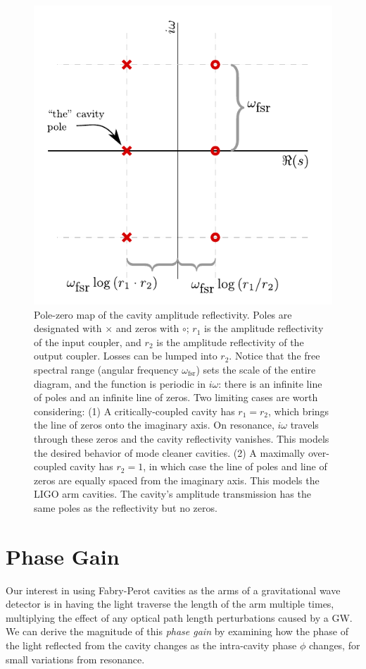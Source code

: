 \begin{figure}
\centering\includegraphics{figures/cavitypzmap.pdf}
\caption[Pole-zero map of Fabry-Perot cavity reflectivity]{\label{fig:cavpzmap} Pole-zero map of the cavity amplitude
  reflectivity.
  Poles are designated with $\times$ and zeros with
  $\circ$; $r_1$ is the amplitude reflectivity of the input coupler,
  and $r_2$ is the amplitude reflectivity of the output coupler.
  Losses can be lumped into $r_2$.  Notice that the free spectral
  range (angular frequency $\omega_{\textrm{fsr}}$) sets the scale of
  the entire diagram, and the function is periodic in $i\omega$: there
  is an infinite line of poles and an infinite line of zeros.  Two
  limiting cases are worth considering: (1) A critically-coupled
  cavity has $r_1=r_2$, which brings the line of zeros onto the
  imaginary axis. On resonance, $i\omega$ travels through these zeros
  and the cavity reflectivity vanishes.  This models the desired
  behavior of mode cleaner cavities. (2) A maximally over-coupled
  cavity has $r_2=1$, in which case the line of poles and line of
  zeros are equally spaced from the imaginary axis.  This models the
  LIGO arm cavities.  
  The cavity's amplitude transmission has the same poles as the
  reflectivity but no zeros.
}
\end{figure}

\section{Phase Gain}
Our interest in using Fabry-Perot cavities as the arms of a
gravitational wave detector is in having the light traverse the length
of the arm multiple times, multiplying the effect of any optical path
length perturbations caused by a GW.  We can derive the magnitude of
this \emph{phase gain} by examining how the phase of the light reflected from
the cavity changes as the intra-cavity phase $\phi$ changes, for small
variations from resonance.

